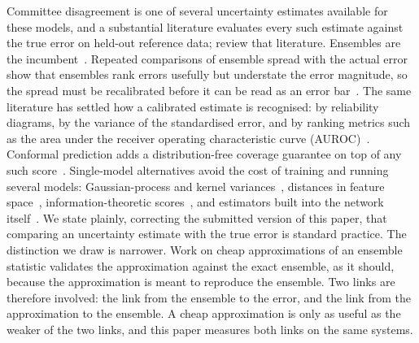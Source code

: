 Committee disagreement is one of several uncertainty estimates available for
these models, and a substantial literature evaluates every such estimate
against the true error on held-out reference data; \citet{dai2025review}
review that literature. Ensembles are the
incumbent~\citep{lakshminarayanan2017simple}. Repeated comparisons of ensemble
spread with the actual error show that ensembles rank errors usefully but
understate the error magnitude, so the spread must be recalibrated before it
can be read as an error
bar~\citep{imbalzano2021uncertainty,kahle2022quality,busk2021calibrated,tan2023single,carrete2023deep}.
The same literature has settled how a calibrated estimate is recognised: by
reliability diagrams, by the variance of the standardised error, and by ranking
metrics such as the area under the receiver operating characteristic curve
(AUROC)~\citep{tran2020methods,pernot2022long,levi2022evaluating}. Conformal
prediction adds a distribution-free coverage guarantee on top of any such
score~\citep{hu2022conformal}. Single-model alternatives avoid the cost of
training and running several models: Gaussian-process and kernel
variances~\citep{musil2019fast,vandermause2020flare}, distances in feature
space~\citep{janet2019quantitative,zhu2023fast}, information-theoretic
scores~\citep{schwalbekoda2025information}, and estimators built into the
network
itself~\citep{wollschlager2023uncertainty,bigi2024rigidity,heid2024spatially}.
We state plainly, correcting the submitted version of this paper, that
comparing an uncertainty estimate with the true error is standard practice.
The distinction we draw is narrower. Work on cheap approximations of an
ensemble statistic validates the approximation against the exact ensemble, as
it should, because the approximation is meant to reproduce the ensemble. Two
links are therefore involved: the link from the ensemble to the error, and the
link from the approximation to the ensemble. A cheap approximation is only as
useful as the weaker of the two links, and this paper measures both links on
the same systems.

